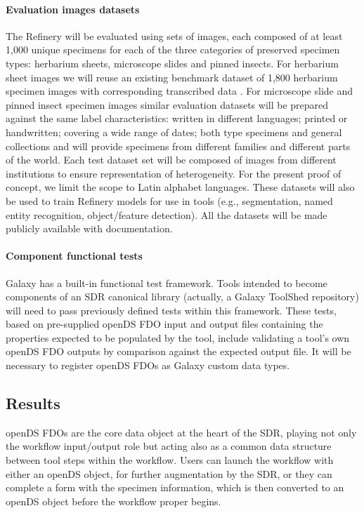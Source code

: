\paragraph{Evaluation images datasets}\label{evaluation-images-datasets}

The Refinery will be evaluated using sets of images, each composed of at
least 1,000 unique specimens for each of the three categories of
preserved specimen types: herbarium sheets, microscope slides and pinned
insects. For herbarium sheet images we will reuse an existing benchmark
dataset of 1,800 herbarium specimen images with corresponding
transcribed data \cite{ch8-59}. For microscope slide and pinned insect
specimen images similar evaluation datasets will be prepared against the
same label characteristics: written in different languages; printed or
handwritten; covering a wide range of dates; both type specimens and
general collections and will provide specimens from different families
and different parts of the world. Each test dataset set will be composed
of images from different institutions to ensure representation of
heterogeneity. For the present proof of concept, we limit the scope to
Latin alphabet languages. These datasets will also be used to train
Refinery models for use in tools (e.g., segmentation, named entity
recognition, object/feature detection). All the datasets will be made
publicly available with documentation.

\paragraph{Component functional tests}\label{component-functional-tests}

Galaxy has a built-in functional test framework. Tools intended to
become components of an SDR canonical library (actually, a Galaxy
ToolShed repository) will need to pass previously defined tests within
this framework. These tests, based on pre-supplied openDS FDO input and
output files containing the properties expected to be populated by the
tool, include validating a tool's own openDS FDO outputs by comparison
against the expected output file. It will be necessary to register
openDS FDOs as Galaxy custom data types.

\subsection{Results}\label{results}

openDS FDOs are the core data object at the heart of the SDR, playing
not only the workflow input/output role but acting also as a common data
structure between tool steps within the workflow. Users can launch the
workflow with either an openDS object, for further augmentation by the
SDR, or they can complete a form with the specimen information, which is
then converted to an openDS object before the workflow proper begins.

